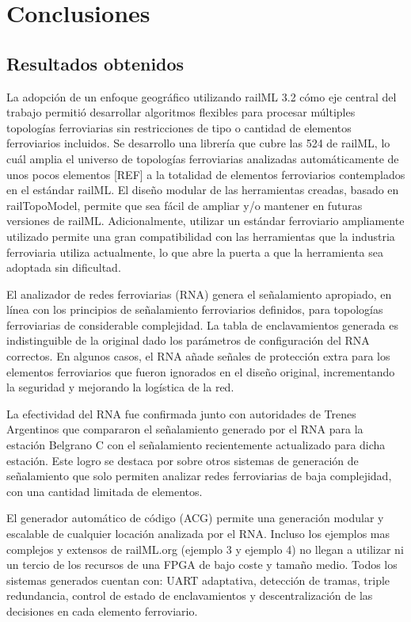 \chapter{Conclusiones}

\section{Resultados obtenidos}

La adopción de un enfoque geográfico utilizando railML 3.2 cómo eje central del trabajo permitió desarrollar algoritmos flexibles para procesar múltiples topologías ferroviarias sin restricciones de tipo o cantidad de elementos ferroviarios incluidos. Se desarrollo una librería que cubre las 524 de railML, lo cuál amplia el universo de topologías ferroviarias analizadas automáticamente de unos pocos elementos [REF] a la totalidad de elementos ferroviarios contemplados en el estándar railML. El diseño modular de las herramientas creadas, basado en railTopoModel, permite que sea fácil de ampliar y/o mantener en futuras versiones de railML. Adicionalmente, utilizar un estándar ferroviario ampliamente utilizado permite una gran compatibilidad con las herramientas que la industria ferroviaria utiliza actualmente, lo que abre la puerta a que la herramienta sea adoptada sin dificultad.

El analizador de redes ferroviarias (RNA) genera el señalamiento apropiado, en línea con los principios de señalamiento ferroviarios definidos, para topologías ferroviarias de considerable complejidad. La tabla de enclavamientos generada es indistinguible de la original dado los parámetros de configuración del RNA correctos. En algunos casos, el RNA añade señales de protección extra para los elementos ferroviarios que fueron ignorados en el diseño original, incrementando la seguridad y mejorando la logística de la red.

La efectividad del RNA fue confirmada junto con autoridades de Trenes Argentinos que compararon el señalamiento generado por el RNA para la estación Belgrano C con el señalamiento recientemente actualizado para dicha estación. Este logro se destaca por sobre otros sistemas de generación de señalamiento que solo permiten analizar redes ferroviarias de baja complejidad, con una cantidad limitada de elementos.

El generador automático de código (ACG) permite una generación modular y escalable de cualquier locación analizada por el RNA. Incluso los ejemplos mas complejos y extensos de railML.org (ejemplo 3 y ejemplo 4) no llegan a utilizar ni un tercio de los recursos de una FPGA de bajo coste y tamaño medio. Todos los sistemas generados cuentan con: UART adaptativa, detección de tramas, triple redundancia, control de estado de enclavamientos y descentralización de las decisiones en cada 
elemento ferroviario.

